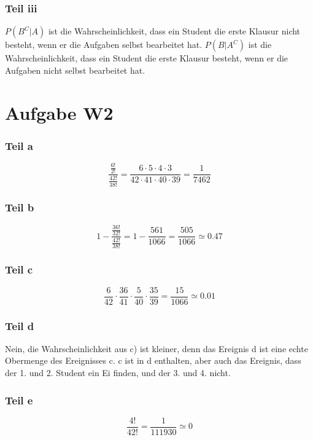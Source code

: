 \documentclass[10pt,a4paper]{article}
\begin{document}
\subsubsection{Teil iii}

$P(B^{C} | A)$ ist die Wahrscheinlichkeit, dass ein Student die erste Klausur nicht besteht, wenn er die Aufgaben selbst bearbeitet hat.
$P(B | A^{C})$ ist die Wahrscheinlichkeit, dass ein Student die erste Klausur besteht, wenn er die Aufgaben nicht selbst bearbeitet hat.

\section{Aufgabe W2}

\subsubsection{Teil a}
\begin{equation}
  \frac{\frac{6!}{2!}}{\frac{42!}{38!}} = \frac{6 \cdot 5 \cdot 4 \cdot 3}{42 \cdot 41 \cdot 40 \cdot 39} = \frac{1}{7462}
\end{equation}

\subsubsection{Teil b}
\begin{equation}
  1 - \frac{\frac{36!}{32!}}{\frac{42!}{38!}} = 1 - \frac{561}{1066} = \frac{505}{1066} \simeq 0.47
\end{equation}

\subsubsection{Teil c}
\begin{equation}
  \frac{6}{42} \cdot \frac{36}{41} \cdot \frac{5}{40} \cdot \frac{35}{39} = \frac{15}{1066} \simeq 0.01
\end{equation}

\subsubsection{Teil d}
Nein, die Wahrscheinlichkeit aus c) ist kleiner, denn das Ereignis d ist eine echte Obermenge des Ereignisses c.
c ist in d enthalten, aber auch das Ereignis, dass der 1. und 2. Student ein Ei finden, und der 3. und 4. nicht.

\subsubsection{Teil e}
\begin{equation}
  \frac{4!}{42!} = \frac{1}{111930} \simeq 0
\end{equation}
\end{document}
